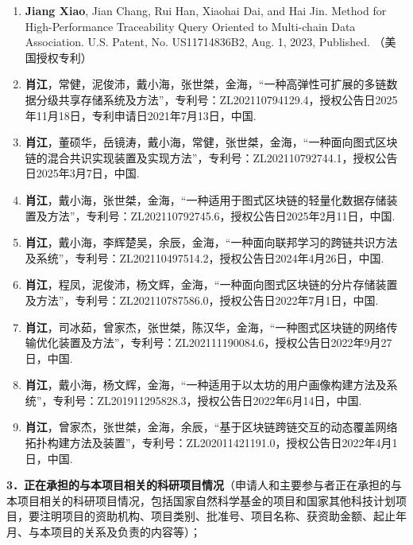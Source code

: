{\begin{enumerate}[itemsep=0pt, topsep=0pt, parsep=0pt]
    \item \textbf{Jiang Xiao}, Jian Chang, Rui Han, Xiaohai Dai, and Hai Jin. Method for High-Performance Traceability Query Oriented to Multi-chain Data Association. U.S. Patent, No. US11714836B2, Aug. 1, 2023, Published. （美国授权专利）

    \item \textbf{肖江}，常健，泥俊沛，戴小海，张世桀，金海，“一种高弹性可扩展的多链数据分级共享存储系统及方法”，专利号：ZL202110794129.4，授权公告日2025年11月18日，专利申请日2021年7月13日，中国.

    \item \textbf{肖江}，董硕华，岳镜涛，戴小海，常健，张世桀，金海，“一种面向图式区块链的混合共识实现装置及实现方法”，专利号：ZL202110792744.1，授权公告日2025年3月7日，中国.

    \item \textbf{肖江}，戴小海，张世桀，金海，“一种适用于图式区块链的轻量化数据存储装置及方法”，专利号：ZL202110792745.6，授权公告日2025年2月11日，中国.

    \item \textbf{肖江}，戴小海，李辉楚吴，余辰，金海，“一种面向联邦学习的跨链共识方法及系统”，专利号：ZL202110497514.2，授权公告日2024年4月26日，中国.

    \item \textbf{肖江}，程凤，泥俊沛，杨文辉，金海，“一种面向图式区块链的分片存储装置及方法”，专利号：ZL202110787586.0，授权公告日2022年7月1日，中国.

    \item \textbf{肖江}，司冰茹，曾家杰，张世桀，陈汉华，金海，“一种图式区块链的网络传输优化装置及方法”，专利号：ZL202111190084.6，授权公告日2022年9月27日，中国.

    \item \textbf{肖江}，戴小海，杨文辉，金海，“一种适用于以太坊的用户画像构建方法及系统”，专利号：ZL201911295828.3，授权公告日2022年6月14日，中国.

    \item \textbf{肖江}，曾家杰，张世桀，金海，余辰，“基于区块链跨链交互的动态覆盖网络拓扑构建方法及装置”，专利号：ZL202011421191.0，授权公告日2022年4月1日，中国.
\end{enumerate}

}


\vspace{0.3cm}

{\sihao \kaishu \color{MsBlue}
\textbf{3．正在承担的与本项目相关的科研项目情况}（申请人和主要参与者正在承担的与本项目相关的科研项目情况，包括国家自然科学基金的项目和国家其他科技计划项目，要注明项目的资助机构、项目类别、批准号、项目名称、获资助金额、起止年月、与本项目的关系及负责的内容等）；
}

